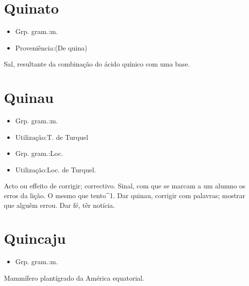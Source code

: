\section{Quinato}
\begin{itemize}
\item {Grp. gram.:m.}
\end{itemize}
\begin{itemize}
\item {Proveniência:(De \textunderscore quina\textunderscore )}
\end{itemize}
Sal, resultante da combinação do ácido quínico com uma base.
\section{Quinau}
\begin{itemize}
\item {Grp. gram.:m.}
\end{itemize}
\begin{itemize}
\item {Utilização:T. de Turquel}
\end{itemize}
\begin{itemize}
\item {Grp. gram.:Loc.}
\end{itemize}
\begin{itemize}
\item {Utilização:Loc. de Turquel.}
\end{itemize}
Acto ou effeito de corrigir; correctivo.
Sinal, com que se marcam a um alumno os erros da lição.
O mesmo que \textunderscore tento\textunderscore ^1.
\textunderscore Dar quinau\textunderscore , corrigir com palavras; mostrar que alguêm errou.
Dar fé, têr notícia.
\section{Quincaju}
\begin{itemize}
\item {Grp. gram.:m.}
\end{itemize}
Mammífero plantígrado da América equatorial.
